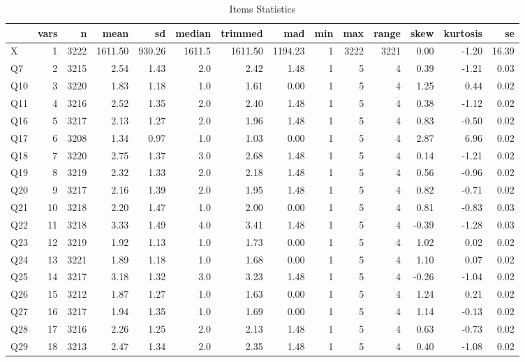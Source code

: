 \documentclass[
]{report}
\begin{document}
\begin{table}

\caption{\label{tab:unnamed-chunk-9}Items Statistics}
\centering
\begin{tabular}[t]{lrrrrrrrrrrrrr}
\toprule
  & vars & n & mean & sd & median & trimmed & mad & min & max & range & skew & kurtosis & se\\
\midrule
X & 1 & 3222 & 1611.50 & 930.26 & 1611.5 & 1611.50 & 1194.23 & 1 & 3222 & 3221 & 0.00 & -1.20 & 16.39\\
Q7 & 2 & 3215 & 2.54 & 1.43 & 2.0 & 2.42 & 1.48 & 1 & 5 & 4 & 0.39 & -1.21 & 0.03\\
Q10 & 3 & 3220 & 1.83 & 1.18 & 1.0 & 1.61 & 0.00 & 1 & 5 & 4 & 1.25 & 0.44 & 0.02\\
Q11 & 4 & 3216 & 2.52 & 1.35 & 2.0 & 2.40 & 1.48 & 1 & 5 & 4 & 0.38 & -1.12 & 0.02\\
Q16 & 5 & 3217 & 2.13 & 1.27 & 2.0 & 1.96 & 1.48 & 1 & 5 & 4 & 0.83 & -0.50 & 0.02\\
\addlinespace
Q17 & 6 & 3208 & 1.34 & 0.97 & 1.0 & 1.03 & 0.00 & 1 & 5 & 4 & 2.87 & 6.96 & 0.02\\
Q18 & 7 & 3220 & 2.75 & 1.37 & 3.0 & 2.68 & 1.48 & 1 & 5 & 4 & 0.14 & -1.21 & 0.02\\
Q19 & 8 & 3219 & 2.32 & 1.33 & 2.0 & 2.18 & 1.48 & 1 & 5 & 4 & 0.56 & -0.96 & 0.02\\
Q20 & 9 & 3217 & 2.16 & 1.39 & 2.0 & 1.95 & 1.48 & 1 & 5 & 4 & 0.82 & -0.71 & 0.02\\
Q21 & 10 & 3218 & 2.20 & 1.47 & 1.0 & 2.00 & 0.00 & 1 & 5 & 4 & 0.81 & -0.83 & 0.03\\
\addlinespace
Q22 & 11 & 3218 & 3.33 & 1.49 & 4.0 & 3.41 & 1.48 & 1 & 5 & 4 & -0.39 & -1.28 & 0.03\\
Q23 & 12 & 3219 & 1.92 & 1.13 & 1.0 & 1.73 & 0.00 & 1 & 5 & 4 & 1.02 & 0.02 & 0.02\\
Q24 & 13 & 3221 & 1.89 & 1.18 & 1.0 & 1.68 & 0.00 & 1 & 5 & 4 & 1.10 & 0.07 & 0.02\\
Q25 & 14 & 3217 & 3.18 & 1.32 & 3.0 & 3.23 & 1.48 & 1 & 5 & 4 & -0.26 & -1.04 & 0.02\\
Q26 & 15 & 3212 & 1.87 & 1.27 & 1.0 & 1.63 & 0.00 & 1 & 5 & 4 & 1.24 & 0.21 & 0.02\\
\addlinespace
Q27 & 16 & 3217 & 1.94 & 1.35 & 1.0 & 1.69 & 0.00 & 1 & 5 & 4 & 1.14 & -0.13 & 0.02\\
Q28 & 17 & 3216 & 2.26 & 1.25 & 2.0 & 2.13 & 1.48 & 1 & 5 & 4 & 0.63 & -0.73 & 0.02\\
Q29 & 18 & 3213 & 2.47 & 1.34 & 2.0 & 2.35 & 1.48 & 1 & 5 & 4 & 0.40 & -1.08 & 0.02\\

\end{tabular}
\end{table}
\end{document}
